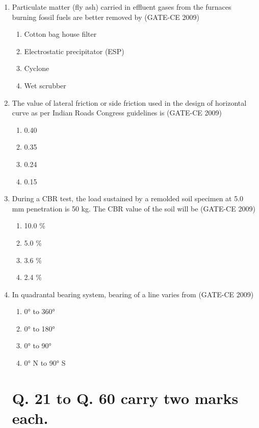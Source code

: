 \documentclass[12pt]{article}
\begin{document}
\begin{enumerate}[label=Q.\arabic*]
    \item Particulate matter (fly ash) carried in effluent gases from the furnaces burning fossil fuels are better removed by (GATE-CE 2009)
    \begin{enumerate}[label=(\Alph*)]
        \item Cotton bag house filter 
        \item Electrostatic precipitator (ESP)
        \item Cyclone 
        \item Wet scrubber
    \end{enumerate}
    
    \item The value of lateral friction or side friction used in the design of horizontal curve as per Indian Roads Congress guidelines is (GATE-CE 2009)
    \begin{enumerate}[label=(\Alph*)]
        \item 0.40 
        \item 0.35 
        \item 0.24 
        \item 0.15
    \end{enumerate}
    
    \item During a CBR test, the load sustained by a remolded soil specimen at 5.0 mm penetration is 50 kg. The CBR value of the soil will be (GATE-CE 2009)
    \begin{enumerate}[label=(\Alph*)]
        \item 10.0 \% 
        \item 5.0 \% 
        \item 3.6 \% 
        \item 2.4 \%
    \end{enumerate}
    
    \item In quadrantal bearing system, bearing of a line varies from (GATE-CE 2009)
    \begin{enumerate}[label=(\Alph*)]
        \item 0° to 360° 
        \item 0° to 180° 
        \item 0° to 90° 
        \item 0° N to 90° S
    \end{enumerate}

\section*{Q. 21 to Q. 60 carry two marks each.}


\end{enumerate}
\end{document}
